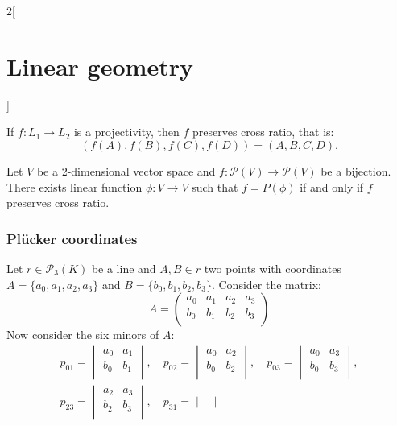 \documentclass[../../../main.tex]{subfiles}
\begin{document}
\begin{multicols}{2}[\section{Linear geometry}]
\begin{definition}
    \end{definition}
    \begin{theorem}
        If $f:L_1\rightarrow L_2$ is a projectivity, then $f$ preserves cross ratio, that is: $$(f(A),f(B),f(C),f(D))=(A,B,C,D).$$
    \end{theorem}
    \begin{theorem}
        Let $V$ be a 2-dimensional vector space and $f:\mathcal{P}(V)\rightarrow \mathcal{P}(V)$ be a bijection. There exists linear function $\phi:V\rightarrow V$ such that $f=P(\phi)$ if and only if $f$ preserves cross ratio.
    \end{theorem}
    \subsubsection*{Plücker coordinates}
    \begin{prop}
        Let $r\in\mathcal{P}_3(K)$ be a line and $A,B\in r$ two points with coordinates $A=\{a_0,a_1,a_2,a_3\}$ and $B=\{b_0,b_1,b_2,b_3\}$. Consider the matrix: $$A=\begin{pmatrix}
                a_0 & a_1 & a_2 & a_3 \\
                b_0 & b_1 & b_2 & b_3 \\
            \end{pmatrix}$$ Now consider the six minors of $A$:
        \begin{gather*}
            p_{01}=\begin{vmatrix}
                a_0 & a_1 \\
                b_0 & b_1 \\
            \end{vmatrix},\quad p_{02}=\begin{vmatrix}
                a_0 & a_2 \\
                b_0 & b_2 \\
            \end{vmatrix},\quad p_{03}=\begin{vmatrix}
                a_0 & a_3 \\
                b_0 & b_3 \\
            \end{vmatrix},\\ p_{23}=\begin{vmatrix}
                a_2 & a_3 \\
                b_2 & b_3 \\
            \end{vmatrix},\quad p_{31}=\begin{vmatrix}

\end{vmatrix}
\end{gather*}
\end{prop}
\end{multicols}
\end{document}
